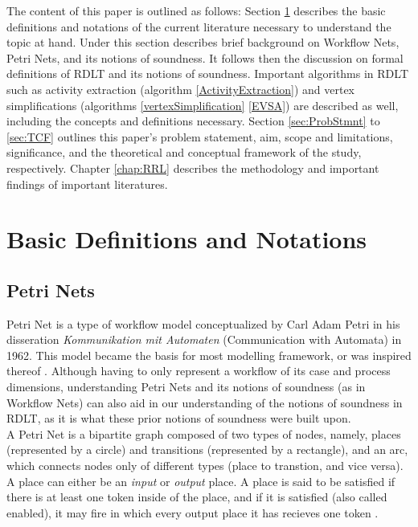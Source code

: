 The content of this paper is outlined as follows: Section \ref{sec: BasicDefNot} describes the basic definitions and notations of the current literature necessary to understand the topic at hand. Under this section describes brief background on Workflow Nets, Petri Nets, and its notions of soundness. It follows then the discussion on formal definitions of RDLT and its notions of soundness. Important algorithms in RDLT such as activity extraction (algorithm \ref{ActivityExtraction}) and vertex simplifications (algorithms \ref{vertexSimplification} \ref{EVSA}) are described as well, including the concepts and definitions necessary. Section \ref{sec:ProbStmnt} to \ref{sec:TCF} outlines this paper's problem statement, aim, scope and limitations, significance, and the theoretical and conceptual framework of the study, respectively. Chapter \ref{chap:RRL} describes the methodology and important findings of important literatures.

\section{Basic Definitions and Notations}
    \label{sec: BasicDefNot}
\subsection*{Petri Nets}
Petri Net \cite{Petri1962} is a type of workflow model conceptualized by Carl Adam Petri in his disseration  \emph{Kommunikation mit Automaten} (Communication with Automata) in 1962. This model became the basis for most modelling framework, or was inspired thereof \cite{Malinao2017}. Although having to only represent a workflow of its case and process dimensions, understanding Petri Nets and its notions of soundness (as in Workflow Nets) can also aid in our understanding of the notions of soundness in RDLT, as it is what these prior notions of soundness were built upon. \\

A Petri Net is a bipartite graph composed of two types of nodes, namely, places (represented by a circle) and transitions (represented by a rectangle), and an arc, which connects nodes only of different types (place to transtion, and vice versa). \\
A place can either be an \emph{input}  or \emph{output} place. A place is said to be satisfied if there is at least one token inside of the place, and if it is satisfied (also called enabled), it may fire in which every output place it has recieves one token \cite{Petri1962}. \\ 

